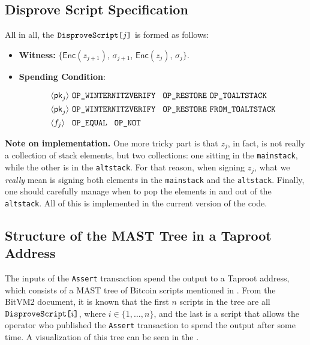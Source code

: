 \documentclass{iacrtrans}
\newcommand{\elem}[1]{\, \langle #1 \rangle \,}
\newcommand{\opcode}[1]{\, \texttt{#1} \,}
\begin{document}
\subsection{Disprove Script Specification}

All in all, the $\texttt{DisproveScript[\text{$j$}]}$ is formed as follows:
\begin{itemize}
  \item \textbf{Witness:} $\Big\{\mathsf{Enc}(z_{j+1})$, $\sigma_{j+1}$, $\mathsf{Enc}(z_{j})$, $\sigma_j\Big\}$.
  \item \textbf{Spending Condition}:
  \begin{empheqboxed}
    \begin{align*}
      &\elem{\mathsf{pk}_j} \opcode{\texttt{OP\_WINTERNITZVERIFY} } \opcode{\texttt{OP\_RESTORE}} \opcode{\texttt{OP\_TOALTSTACK}} \\
      &\elem{\mathsf{pk}_{j}} \opcode{\texttt{OP\_WINTERNITZVERIFY} } \opcode{\texttt{OP\_RESTORE}} \opcode{\texttt{FROM\_TOALTSTACK}} \\
      &\elem{f_j} \opcode{ \texttt{OP\_EQUAL} } \opcode{\texttt{OP\_NOT}}
    \end{align*}
  \end{empheqboxed}
\end{itemize}

\textbf{Note on implementation.} One more tricky part is that $z_j$, in fact, is not really a collection of stack elements, but two collections: one sitting in the \texttt{mainstack}, while the other is in the \texttt{altstack}. For that reason, when signing $z_j$, what we \textit{really} mean is signing both elements in the \texttt{mainstack} and the \texttt{altstack}. Finally, one should carefully manage when to pop the elements in and out of the \texttt{altstack}. All of this is implemented in the current version of the code.

\subsection{Structure of the MAST Tree in a Taproot
Address}\label{sec:mast-tree-structure}

The inputs of the \texttt{Assert} transaction spend the output to a
Taproot address, which consists of a MAST tree of Bitcoin scripts
mentioned in . From the BitVM2 document, it
is known that the first \(n\) scripts in the tree are all
\(\texttt{DisproveScript[\text{$i$}]}\), where \(i \in \{1,\dots, n\}\), and the last is a
script that allows the operator who published the \texttt{Assert}
transaction to spend the output after some time. A visualization of
this tree can be seen in the .
\end{document}
